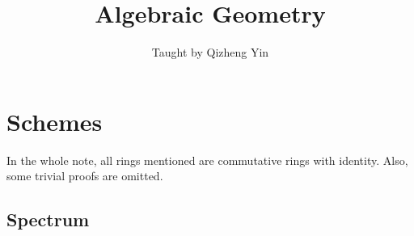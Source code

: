 \documentclass{ctexart}
\title{Algebraic Geometry}
\author{Taught by Qizheng Yin}
\date{}
\begin{document}
\maketitle
\newpage

\tableofcontents
\newpage

\section{Schemes}
\label{section:Schemes}

In the whole note, all rings mentioned are commutative rings with identity.
Also, some trivial proofs are omitted.

\subsection{Spectrum}
\label{subsection:Schemes_Spectrum}
\end{document}

